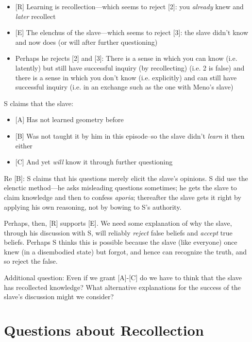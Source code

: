 \documentclass[10 pt]{article}
\begin{document}
\begin{itemize}\item{[R] Learning is recollection---which seems to reject [2]: you \emph{already} knew and \emph{later} recollect}\item{[E] The elenchus of the slave---which seems to reject [3]: the slave didn't know and now does (or will after further questioning)}\item{Perhaps he rejects [2] and [3]: There is a sense in which you can know (i.e. latently) but still have successful inquiry (by recollecting) (i.e. 2 is false) and there is a sense in which you don't know (i.e. explicitly) and can still have successful inquiry (i.e. in an exchange such as the one with Meno's slave)}\end{itemize}

\noindent S claims that the slave:
\begin{itemize}\item{[A] Has not learned geometry before}\item{[B] Was not taught it by him in this episode--so the slave didn't \emph{learn} it then either}\item{[C] And yet \emph{will} know it through further questioning}\end{itemize}

\noindent Re [B]: S claims that his questions merely elicit the slave's opinions. S did use the elenctic method---he asks misleading questions sometimes; he gets the slave to claim knowledge and then to confess \emph{aporia}; thereafter the slave gets it right by applying his own reasoning, not by bowing to S's authority.
\vspace*{2mm}

\noindent Perhaps, then, [R] supports [E]. We need some explanation of why the slave, through his discussion with S, will reliably \emph{reject} false beliefs and \emph{accept} true beliefs. Perhaps S thinks this is possible because the slave (like everyone) once knew (in a disembodied state) but forgot, and hence can recognize the truth, and so reject the false.
\vspace*{2mm}

\noindent Additional question: Even if we grant [A]-[C] do we have to think that the slave has recollected knowledge? What alternative explanations for the success of the slave's discussion might we consider?

\section*{Questions about Recollection}
\end{document}
